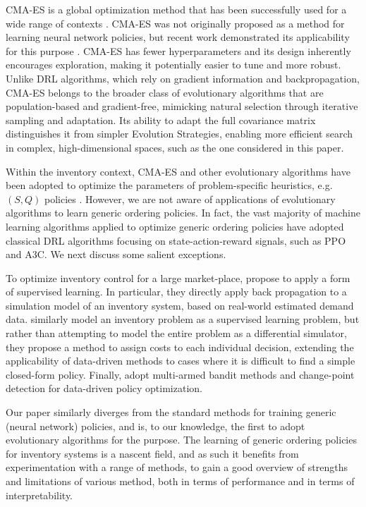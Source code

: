 \documentclass[authoryear,11pt]{elsarticle}
\begin{document}
CMA-ES is a global optimization method that has been successfully used for a wide range of contexts \citep{Hansen1996AdaptingAdaptation,Hansen2001CompletelyStrategies,Hansen2006TheReview}. CMA-ES was not originally proposed as a method for learning neural network policies, but recent work demonstrated its applicability for this purpose \citep{Salimans2017EvolutionLearning}. CMA-ES has fewer hyperparameters and its design inherently encourages exploration, making it potentially easier to tune and more robust. Unlike DRL algorithms, which rely on gradient information and backpropagation, CMA-ES belongs to the broader class of evolutionary algorithms that are population-based and gradient-free, mimicking natural selection through iterative sampling and adaptation. Its ability to adapt the full covariance matrix distinguishes it from simpler Evolution Strategies, enabling more efficient search in complex, high-dimensional spaces, such as the one considered in this paper.

Within the inventory context, CMA-ES and other evolutionary algorithms have been adopted to optimize the parameters of problem-specific heuristics, e.g. $(S,Q)$ policies \citep{Bosman2007InventoryOptimization}. However, we are not aware of applications of evolutionary algorithms to learn generic ordering policies. In fact, the vast majority of machine learning algorithms applied to optimize generic ordering policies have adopted classical DRL algorithms focusing on state-action-reward signals, such as PPO and A3C. We next discuss some salient exceptions.

To optimize inventory control for a large market-place, \cite{madeka2022deepinv} propose to apply a form of supervised learning. In particular, they directly apply back propagation to a simulation model of an inventory system, based on real-world estimated demand data. \cite{vanderhaar2023supervised} similarly model an inventory problem as a supervised learning problem, but rather than attempting to model the entire problem as a differential simulator, they propose a method to assign costs to each individual decision, extending the applicability of data-driven methods \citep{ban2019big} to cases where it is difficult to find a simple closed-form policy. Finally, \cite{amiri2023adaptive} adopt multi-armed bandit methods and change-point detection for data-driven policy optimization.

Our paper similarly diverges from the standard methods for training generic (neural network) policies, and is, to our knowledge, the first to adopt evolutionary algorithms for the purpose. The learning of generic ordering policies for inventory systems is a nascent field, and as such it benefits from experimentation with a range of methods, to gain a good overview of strengths and limitations of various method, both in terms of performance and in terms of interpretability.
\end{document}
